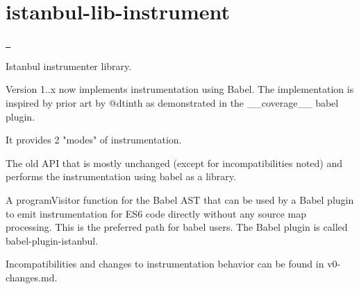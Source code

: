 \chapter{istanbul-\/lib-\/instrument}
\hypertarget{md_node__modules_2istanbul-lib-instrument_2README}{}\label{md_node__modules_2istanbul-lib-instrument_2README}
\label{md_node__modules_2istanbul-lib-instrument_2README_autotoc_md16271}%
%
 \href{https://travis-ci.org/istanbuljs/istanbul-lib-instrument}{\texttt{ }}

Istanbul instrumenter library.

Version 1..\+x now implements instrumentation using {\ttfamily Babel}. The implementation is inspired by prior art by @dtinth as demonstrated in the {\ttfamily \+\_\+\+\_\+coverage\+\_\+\+\_\+} babel plugin.

It provides 2 "{}modes"{} of instrumentation.


\begin{DoxyItemize}
\item The old API that is mostly unchanged (except for incompatibilities noted) and performs the instrumentation using babel as a library.
\item A {\ttfamily program\+Visitor} function for the Babel AST that can be used by a Babel plugin to emit instrumentation for ES6 code directly without any source map processing. This is the preferred path for babel users. The Babel plugin is called {\ttfamily babel-\/plugin-\/istanbul}.
\end{DoxyItemize}

Incompatibilities and changes to instrumentation behavior can be found in v0-\/changes.md. 